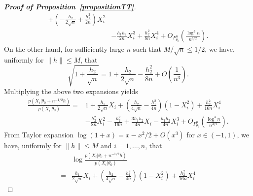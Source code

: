 \documentclass[11pt]{article}
\theoremstyle{plain}
\theoremstyle{definition}
\theoremstyle{remark}
\begin{document}
\begin{appendices}
\begin{proof}[\textbf{Proof of Proposition~\ref{propositionTT}}]
\begin{align*}
+
    \left(
        -\frac{h_2}{2\sqrt{n}}
    +
     \frac{h_1^2}{2n}
\right)
    X_i^2
    \\
     &-\frac{h_1 h_2}{2n}X_i^3
    +\frac{h_2^2}{8n}X_i^4 
    +O_{P^n_{\theta_0}}\left(\frac{\log^3 n}{n^{3/2}}\right).
\end{align*}
On the other hand, for sufficiently large $n $ such that $M/\sqrt n \leq 1/2$, we have, uniformly for $\|h\|\leq M$, that
\begin{equation*}
    \sqrt{1+\frac{h_2}{\sqrt{n}}}=1+\frac{h_2}{2\sqrt{n}}-\frac{h_2^2}{8n} +O\left(\frac{1}{n^3}\right).
\end{equation*}
Multiplying the above two expansions yields
\begin{equation*}
    \begin{split}
    \frac{p(X_i|\theta_0+n^{-1/2}h)}{p(X_i|\theta_0)}
    =&
1
+\frac{h_1}{2\sqrt{n}} X_i
+\left(\frac{h_2}{4\sqrt{n}}-\frac{h_1^2}{4n}\right)
        (1-X_i^2)
    +\frac{h_2^2}{16n}X_i^4 
    \\
    &-\frac{h_2^2}{8n}X_i^2
-\frac{h_2^2}{16n}
+\frac{3 h_1 h_2}{4 n}  X_i
     -\frac{h_1 h_2}{4 n}X_i^3
     +O_{P^n_{\theta_0}}\left(\frac{\log^3 n}{n^{3/2}}\right).
    \end{split}
\end{equation*}
From Taylor expansion $\log(1+x)=x-x^2/2+O(x^3)$ for $x\in(-1,1)$, we have, uniformly for $\|h\|\leq M$ and $i=1,\ldots,n$, that
\begin{equation*}
    \begin{split}
    &\log \frac{p(X_i|\theta_0+n^{-1/2}h)}{p(X_i|\theta_0)}
    \\
    =&
\frac{h_1}{2\sqrt{n}} X_i
+\left(\frac{h_2}{4\sqrt{n}}-\frac{h_1^2}{4n}\right)
        (1-X_i^2)
    +\frac{h_2^2}{16n}X_i^4 

\end{split}
\end{equation*}
\end{proof}
\end{appendices}
\end{document}
